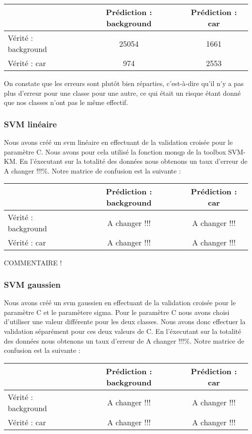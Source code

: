 			\begin{center}
				\begin{tabular}{|l||c|c|}
				  \hline
				  & Prédiction : background & Prédiction : car \\
				  \hline
				  Vérité : background & 25054 & 1661 \\
				  \hline
				  Vérité : car & 974 & 2553 \\
				  \hline
				\end{tabular}
			\end{center}

			On constate que les erreurs sont plutôt bien réparties, c'est-à-dire qu'il n'y a pas plus d'erreur pour une classe pour une autre, ce qui était un risque étant donné que nos classes n'ont pas le même effectif.

		\subsubsection{SVM linéaire}
			Nous avons créé un svm linéaire en effectuant de la validation croisée pour le paramètre C. Nous avons pour cela utilisé la fonction monqp de la toolbox SVM-KM. En l'éxecutant sur la totalité des données nous obtenons un taux d'erreur de A changer !!!\%. Notre matrice de confusion est la suivante : 
			\begin{center}
				\begin{tabular}{|l||c|c|}
				  \hline
				  & Prédiction : background & Prédiction : car \\
				  \hline
				  Vérité : background & A changer !!! & A changer !!! \\
				  \hline
				  Vérité : car & A changer !!! & A changer !!! \\
				  \hline
				\end{tabular}
			\end{center}

			COMMENTAIRE !
		\subsubsection{SVM gaussien}
			Nous avons créé un svm gaussien en effectuant de la validation croisée pour le paramètre C et le paramètere sigma. Pour le paramètre C nous avons choisi d'utiliser une valeur différente pour les deux classes. Nous avons donc effectuer la validation séparément pour ces deux valeurs de C. En l'éxecutant sur la totalité des données nous obtenons un taux d'erreur de A changer !!!\%. Notre matrice de confusion est la suivante : 
			\begin{center}
				\begin{tabular}{|l||c|c|}
				  \hline
				  & Prédiction : background & Prédiction : car \\
				  \hline
				  Vérité : background & A changer !!! & A changer !!! \\
				  \hline
				  Vérité : car & A changer !!! & A changer !!! \\
				  \hline
				\end{tabular}
			\end{center}

